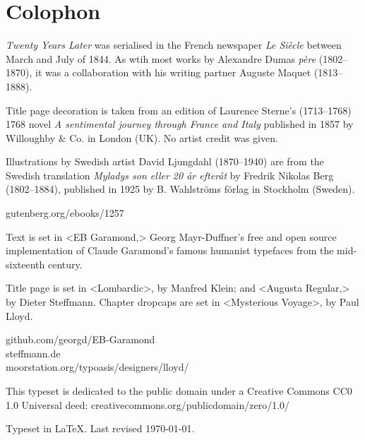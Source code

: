 \documentclass[
a5paper,
]{scrbook}
\begin{document}
\chapter*{Colophon}

\centering

\vfill
\begin{minipage}{\textwidth}
\textit{Twenty Years Later} was serialised in the French newspaper \textit{Le Siècle} between March and July of 1844.  As wtih most works by Alexandre Dumas \textit{père} (1802--1870), it was a collaboration with his writing partner Auguste Maquet (1813--1888).

Title page decoration is taken from an edition of Laurence Sterne's (1713--1768) 1768 novel \textit{A sentimental journey through France and Italy} published in 1857 by Willoughby \& Co. in London (UK). No artist credit was given.

Illustrations by Swedish artist David Ljungdahl (1870--1940) are from the Swedish translation \textit{	
Myladys son eller 20 år efteråt} by Fredrik Nikolas Berg (1802--1884), published in 1925 by B. Wahlströms förlag in Stockholm (Sweden).
\end{minipage}
\vfill
gutenberg.org/ebooks/1257
\vfill
\divider
\vfill
\begin{minipage}{\textwidth}
Text is set in <EB Garamond,> Georg Mayr-Duffner's free and open source implementation of Claude Garamond’s famous humanist typefaces from the mid-sixteenth century.

Title page is set in <Lombardic>, by Manfred Klein; and <Augusta Regular,> by Dieter Steffmann. Chapter dropcaps are set in <Mysterious Voyage>, by Paul Lloyd.
\end{minipage}
\vfill
github.com/georgd/EB-Garamond\\steffmann.de\\moorstation.org/typoasis/designers/lloyd/
\vfill
\divider
\vfill
\begin{minipage}{\textwidth}
This typeset is dedicated to the public domain under a Creative Commons CC0 1.0 Universal deed: creativecommons.org/publicdomain/zero/1.0/\\
\end{minipage}
\vfill
\divider
\vfill
Typeset in \LaTeX{}. Last revised \today.
\thispagestyle{empty}
\end{document}
